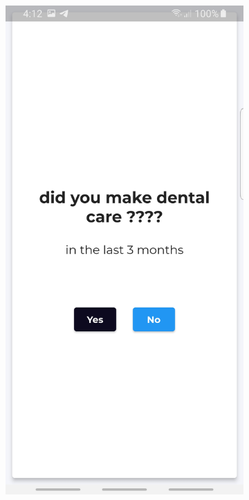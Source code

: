 \begin{figure}
\begin{subfigure}{.31\textwidth}
  \label{fig:sub-second}
\end{subfigure}
\begin{subfigure}{.31\textwidth}
  \centering
  \includegraphics[width=1\linewidth]{images1/quess3.jpg}  

\end{subfigure}
\end{figure}
